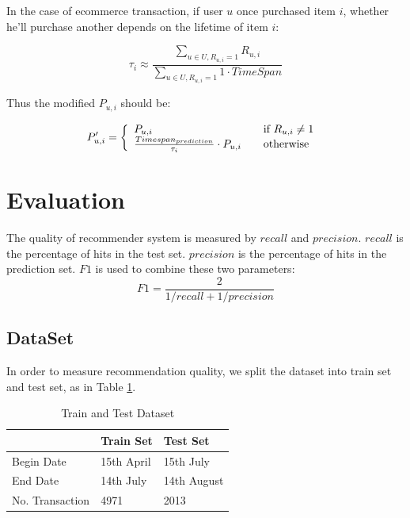\documentclass[11pt,a4paper,titlepage]{article}
\begin{document}
In the case of ecommerce transaction, if user $u$ once purchased item $i$, whether he'll purchase another depends on the lifetime of item $i$:

\begin{equation}
\tau_i \approx \frac{\sum_{u \in U, R_{u,i}=1} R_{u,i}}{\sum_{u \in U, R_{u,i}=1}1 \cdot TimeSpan}
\end{equation}

Thus the modified $P_{u,i}$ should be:

\begin{equation}
    P'_{u,i} = \left\{ 
    \begin{array}{l l}
    P_{u,i} & \quad \text{if $R_{u,i} \neq 1$ }\\
    \frac{Timespan_{prediction}}{\tau_i} \cdot P_{u,i} & \quad \text{otherwise}
    \end{array} \right.
\end{equation}


\section{Evaluation}


The quality of recommender system is measured by $recall$ and $precision$.  $recall$ is the percentage of hits in the test set.  $precision$ is the percentage of hits in the prediction set.  $F1$ is used to combine these two parameters:
\begin{equation}
F1 = \frac{2}{1/recall + 1/precision}
\end{equation}


\subsection{DataSet}

In order to measure recommendation quality, we split the dataset into train set and test set, as in Table \ref{tab:train-test}.

\begin{table}[!h]
\centering
\begin{tabular}{ | l | l | l | }
\hline
~           & Train Set & Test Set \\ \hline
Begin Date  & 15th April    & 15th July  \\ \hline
End Date    & 14th July     & 14th August  \\ \hline
No. Transaction    & 4971   & 2013    \\ \hline
\end{tabular}
\caption{Train and Test Dataset}
\label{tab:train-test}
\end{table}
\end{document}
